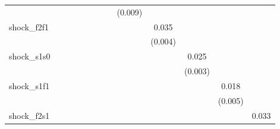 {\begin{tabular}{l*{12}{c}}
            &                     &                     &                     &                     &                     &                     &                     &     (0.009)         &                     &                     &                     &                     \\
\addlinespace
shock\_f2f1  &                     &                     &                     &                     &                     &                     &                     &                     &       0.035\sym{***}&                     &                     &                     \\
            &                     &                     &                     &                     &                     &                     &                     &                     &     (0.004)         &                     &                     &                     \\
\addlinespace
shock\_s1s0  &                     &                     &                     &                     &                     &                     &                     &                     &                     &       0.025\sym{***}&                     &                     \\
            &                     &                     &                     &                     &                     &                     &                     &                     &                     &     (0.003)         &                     &                     \\
\addlinespace
shock\_s1f1  &                     &                     &                     &                     &                     &                     &                     &                     &                     &                     &       0.018\sym{***}&                     \\
            &                     &                     &                     &                     &                     &                     &                     &                     &                     &                     &     (0.005)         &                     \\
\addlinespace
shock\_f2s1  &                     &                     &                     &                     &                     &                     &                     &                     &                     &                     &                     &       0.033\sym{***}\\

\end{tabular}}
